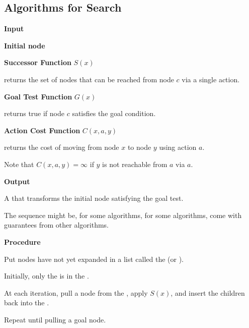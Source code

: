 \subsection{Algorithms for Search}

\begin{listu}
    \item \textbf{Input}

    \begin{listu}
        \item \textbf{Initial node}

        \item \textbf{Successor Function} $S(x)$

        returns the set of nodes that can be reached from node $c$ via a single action.

        \item \textbf{Goal Test Function} $G(x)$

        returns true if node $c$ satisfies the goal condition.

        \item \textbf{Action Cost Function} $C(x, a, y)$

        returns the cost of moving from node $x$ to node $y$ using action $a$.

        Note that $C(x, a, y) = \infty$ if $y$ is not reachable from $a$ via $a$.
    \end{listu}

    \item \textbf{Output}

    \begin{listu}
        \item A  that transforms the initial node satisfying the goal test.
        \item The sequence might be,  for some algorithms,  for some algorithms, come with  guarantees from other algorithms.
    \end{listu}

    \item \textbf{Procedure}

    \begin{listu}
        \item Put nodes have not yet expanded in a list called the \term{\Frontier} (or ).
        \item Initially, only the  is in the \Frontier.
        \item At each iteration, pull a node from the \Frontier, apply $S(x)$, and insert the children back into the \Frontier.
        \item Repeat until pulling a goal node.
    \end{listu}
\end{listu}

